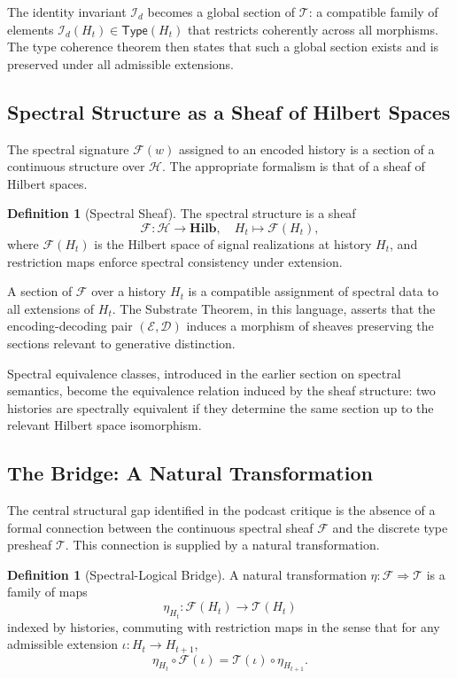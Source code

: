 \documentclass[12pt, a4paper]{article}
\theoremstyle{plain}
\theoremstyle{definition}
\newtheorem{definition}[theorem]{Definition}
\theoremstyle{remark}
\begin{document}
The identity invariant $\mathcal{I}_d$ becomes a global section of $\mathcal{T}$: a compatible family of elements $\mathcal{I}_d(H_t) \in \mathsf{Type}(H_t)$ that restricts coherently across all morphisms. The type coherence theorem then states that such a global section exists and is preserved under all admissible extensions.

\subsection{Spectral Structure as a Sheaf of Hilbert Spaces}

The spectral signature $\mathcal{F}(w)$ assigned to an encoded history is a section of a continuous structure over $\mathcal{H}$. The appropriate formalism is that of a sheaf of Hilbert spaces.

\begin{definition}[Spectral Sheaf]
The spectral structure is a sheaf
\[
\mathcal{F} : \mathcal{H} \to \mathbf{Hilb},
\quad H_t \mapsto \mathcal{F}(H_t),
\]
where $\mathcal{F}(H_t)$ is the Hilbert space of signal realizations at history $H_t$, and restriction maps enforce spectral consistency under extension.
\end{definition}

A section of $\mathcal{F}$ over a history $H_t$ is a compatible assignment of spectral data to all extensions of $H_t$. The Substrate Theorem, in this language, asserts that the encoding-decoding pair $(\mathcal{E}, \mathcal{D})$ induces a morphism of sheaves preserving the sections relevant to generative distinction.

Spectral equivalence classes, introduced in the earlier section on spectral semantics, become the equivalence relation induced by the sheaf structure: two histories are spectrally equivalent if they determine the same section up to the relevant Hilbert space isomorphism.

\subsection{The Bridge: A Natural Transformation}

The central structural gap identified in the podcast critique is the absence of a formal connection between the continuous spectral sheaf $\mathcal{F}$ and the discrete type presheaf $\mathcal{T}$. This connection is supplied by a natural transformation.

\begin{definition}[Spectral-Logical Bridge]
A natural transformation $\eta : \mathcal{F} \Rightarrow \mathcal{T}$ is a family of maps
\[
\eta_{H_t} : \mathcal{F}(H_t) \to \mathcal{T}(H_t)
\]
indexed by histories, commuting with restriction maps in the sense that for any admissible extension $\iota : H_t \to H_{t+1}$,
\[
\eta_{H_t} \circ \mathcal{F}(\iota) = \mathcal{T}(\iota) \circ \eta_{H_{t+1}}.
\]
\end{definition}
\end{document}
